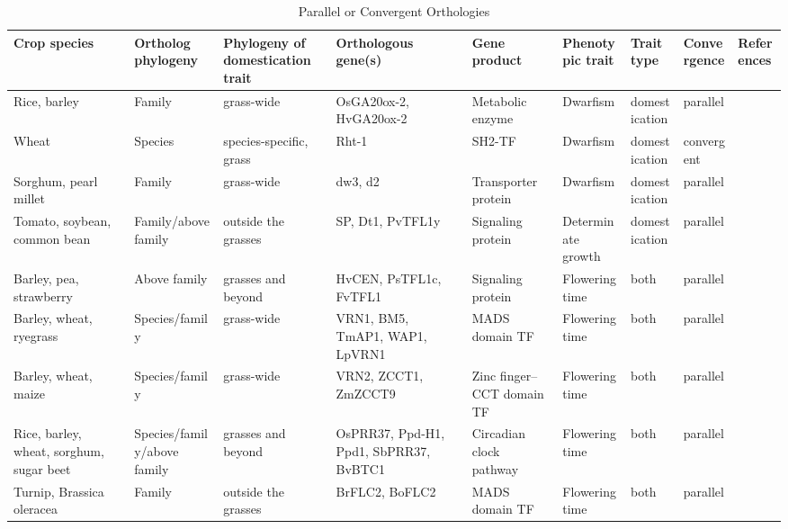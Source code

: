 \documentclass[12pt]{article}
\begin{document}
\begin{table}
\begin{center}
\caption{Parallel or Convergent Orthologies} \label{tab:Ortho}
        \fontsize{7}{8}\selectfont 
    \begin{tabular}{G{3.5cm}G{2.5cm}C{3.10cm}C{3.5cm}C{1.95cm}G{2.0cm}G{1.8cm}G{1.5cm}G{1.5cm}}
\\\toprule  
{\bf Crop species} & {\bf Ortholog phylogeny} & {\bf Phylogeny of domestication trait} & {\bf Orthologous gene(s)} & {\bf Gene product} & {\bf Phenotypic trait} & {\bf Trait type} & {\bf Convergence} & {\bf References} \\\toprule
Rice, barley & Family & grass-wide & OsGA20ox-2, HvGA20ox-2 & Metabolic enzyme & Dwarfism & domestication & parallel & \citep{Asano2007, Asano2011, Jia2009}\\
Wheat & Species & species-specific, grass & Rht-1 & SH2-TF & Dwarfism & domestication & convergent & \citep{Doebley2006}\\
Sorghum, pearl millet & Family & grass-wide & dw3, d2 & Transporter protein & Dwarfism & domestication & parallel & \citep{Multani2003,Parvathaneni2013}\\
Tomato, soybean, common bean & Family/above family & outside the grasses & SP, Dt1, PvTFL1y & Signaling protein & Determinate growth & domestication & parallel & \citep{Doebley2006, Repinski2012, Liu2010, Kwak2012, Tian2010}\\
Barley, pea, strawberry & Above family & grasses and beyond & HvCEN, PsTFL1c, FvTFL1 & Signaling protein & Flowering time & both & parallel & \citep{Comadran2012, Foucher2003, Koskela2012}\\
Barley, wheat, ryegrass & Species/family & grass-wide & VRN1, BM5, TmAP1, WAP1, LpVRN1 & MADS domain TF & Flowering time & both & parallel & \citep{Asp2011}\\
Barley, wheat, maize & Species/family & grass-wide & VRN2, ZCCT1, ZmZCCT9 & Zinc finger–CCT domain TF & Flowering time & both & parallel & \citep{Huang2017}\\
Rice, barley, wheat, sorghum, sugar beet & Species/family/above family & grasses and beyond & OsPRR37, Ppd-H1, Ppd1, SbPRR37, BvBTC1 & Circadian clock pathway & Flowering time & both & parallel & \citep{MURAKAMI2005, Turner2005, Jones2008, Beales2007, Wilhelm2008, Daz2012}\\
Turnip, Brassica oleracea & Family & outside the grasses & BrFLC2, BoFLC2 & MADS domain TF & Flowering time & both & parallel & \citep{Wu2012, Yuan2009, Okazaki2006}\\

\end{tabular}
\end{center}
\end{table}
\end{document}
